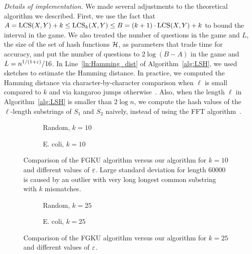 \textit{Details of implementation.}
We made several adjustments to the theoretical algorithm we described. First, we use the fact that $A = \mathrm{LCS}(X,Y)+k \le \mathrm{LCS}_{k}(X,Y) \le B = (k+1)\cdot\mathrm{LCS}(X,Y)+k$ to bound the interval in the \twentyquestions game. We also treated the number of questions in the  \twentyquestions game and $L$, the size of the set of hash functions $\mathcal{H}$, as parameters that trade time for accuracy, and put the number of questions to $2 \log (B-A)$ in the \twentyquestions game and $L = n^{1/(1+\varepsilon)}/16$. In Line~\ref{ln:Hamming_dist} of Algorithm~\ref{alg:LSH}, we used sketches to estimate the Hamming distance. In practice, we computed the Hamming distance via character-by-character comparison when $\ell$ is small compared to $k$ and via kangaroo jumps otherwise~\cite{10.1145/8307.8309}. Also, when the length $\ell$ in Algorithm~\ref{alg:LSH} is smaller than $2 \log n$, we compute the hash values of the $\ell$-length substrings of $S_1$ and $S_2$ naively, instead of using the FFT algorithm~\cite{FischerPaterson}. 

\begin{figure}[ht!]
\centering
    \begin{subfigure}{.5\textwidth}
        \centering
        \captionsetup{justification=centering}
        \caption{Random, $k = 10$}
    \end{subfigure}%
    \begin{subfigure}{0.5\textwidth}
        \centering
        \captionsetup{justification=centering}
        \caption{E. coli, $k = 10$}
    \end{subfigure}
\caption{Comparison of the FGKU algorithm versus our algorithm for $k = 10$ and different values of $\varepsilon$. Large standard deviation for length $60000$ is caused by an outlier with very long longest common substring with $k$ mismatches.}
\label{fig:runtime_10}
\end{figure}

\begin{figure}[ht!]
\centering
    \begin{subfigure}{.5\textwidth}
        \centering
        \captionsetup{justification=centering}
        \caption{Random, $k = 25$}
    \end{subfigure}%
    \begin{subfigure}{0.5\textwidth}
        \centering
        \captionsetup{justification=centering}
        \caption{E. coli, $k = 25$}
    \end{subfigure}     
\caption{Comparison of the FGKU algorithm versus our algorithm for $k = 25$ and different values of $\varepsilon$.}
\label{fig:runtime_25}
\end{figure}
 
